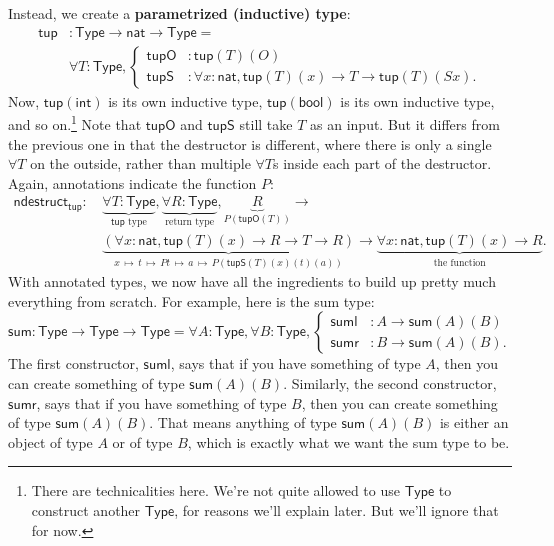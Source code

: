 \documentclass[11pt,paper=letter]{scrartcl}
\renewcommand{\sf}{\mathsf}
\newcommand{\type}{\mathsf{Type}}
\newcommand{\smapsto}{\,\mapsto\,}
\begin{document}
Instead, we create a \textbf{parametrized (inductive) type}:
\begin{align*}
\sf{tup}&: \type \to \sf{nat} \to \type = \\
&\forall T: \type, \begin{cases}
\sf{tupO}&: \sf{tup}(T)(O) \\
\sf{tupS}&: \forall x: \sf{nat}, \sf{tup}(T)(x) \to T \to \sf{tup}(T)(Sx).
\end{cases}
\end{align*}
Now, $\sf{tup}(\sf{int})$ is its own inductive type, $\sf{tup}(\sf{bool})$ is its own inductive type, and so on.\footnote{There are technicalities here. We're not quite allowed to use $\type$ to construct another $\type$, for reasons we'll explain later. But we'll ignore that for now.} Note that $\sf{tupO}$ and $\sf{tupS}$ still take $T$ as an input. But it differs from the previous one in that the destructor is different, where there is only a single $\forall T$ on the outside, rather than multiple $\forall T$s inside each part of the destructor. Again, annotations indicate the function $P$:
\begin{align*}
\sf{ndestruct}_\sf{tup}:\,
&\underbrace{\forall T: \type}_{\sf{tup}\text{ type}},
\underbrace{\forall R: \type}_{\text{return type}},
\underbrace{R}_{P(\sf{tupO}(T))} \to\\
&\underbrace{(\forall x: \sf{nat}, \sf{tup}(T)(x) \to R \to T \to R)}_{x\smapsto t \smapsto Pt \smapsto a \smapsto P(\sf{tupS}(T)(x)(t)(a))} \to
\underbrace{\forall x: \sf{nat}, \sf{tup}(T)(x) \to R}_{\text{the function}}.
\end{align*}
With annotated types, we now have all the ingredients to build up pretty much everything from scratch. For example, here is the sum type: \[
\sf{sum}: \type \to \type \to \type =
\forall A: \type, \forall B: \type, 
  \begin{cases}
  \sf{suml}&: A \to \sf{sum}(A)(B) \\
  \sf{sumr}&: B \to \sf{sum}(A)(B).
  \end{cases}
\]
The first constructor, $\sf{suml}$, says that if you have something of type $A$, then you can create something of type $\sf{sum}(A)(B)$. Similarly, the second constructor, $\sf{sumr}$, says that if you have something of type $B$, then you can create something of type $\sf{sum}(A)(B)$. That means anything of type $\sf{sum}(A)(B)$ is either an object of type $A$ or of type $B$, which is exactly what we want the sum type to be.
\end{document}
